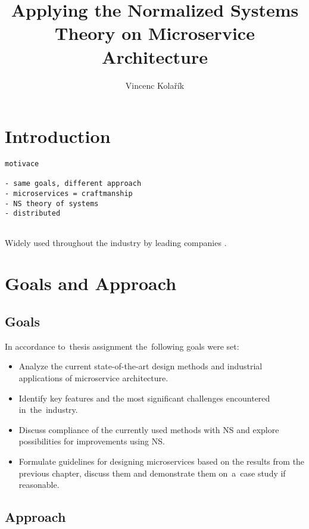 \documentclass[thesis=M,english,hidelinks]{FITthesis}[2012/10/20]
\title{Applying the Normalized Systems Theory on Microservice Architecture}
\author{Vincenc Kolařík} %
\begin{document}
\listoftodos 

%
%
\chapter{Introduction}
\begin{verbatim}
motivace

- same goals, different approach
- microservices = craftmanship
- NS theory of systems
- distributed 
    
\end{verbatim}

Widely used throughout the industry by leading companies \cite{ms-who-is-using}.


%
%

\chapter{Goals and Approach}
\section{Goals}
In accordance to~thesis assignment the~following goals were set:
\begin{itemize}
	\item Analyze the current state-of-the-art design methods and industrial applications of microservice architecture.
	\item Identify key features and the most significant challenges encountered in~the~industry.
	\item Discuss compliance of the currently used methods with \acrlong{NS} and explore possibilities for improvements using \acrshort{NS}. 
	\item Formulate guidelines for designing microservices based on the results from the previous chapter, discuss them and demonstrate them on~a~case study if reasonable.
\end{itemize}

\section{Approach}
\end{document}
